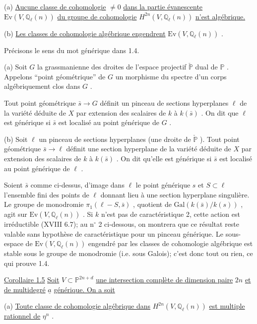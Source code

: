 (a) \underline{Aucune classe de cohomologie} $\neq 0$ \underline{dans la partie évanescente} $\mathrm{Ev}(V, \mathbb{Q}_\ell(n))$ \underline{du groupe de cohomologie} $H^{2n}(V, \mathbb{Q}_\ell(n))$ \underline{n'est algébrique.}

(b) \underline{Les classes de cohomologie algébrique engendrent} $\mathrm{Ev}(V, \mathbb{Q}_\ell(n))$ .

Précisons le sens du mot générique dans 1.4.

(a) Soit $G$ la grassmanienne des droites de l'espace projectif $\check{\mathbb{P}}$ dual de $\mathbb{P}$ . Appelons ``point géométrique'' de $G$ un morphisme du spectre d'un corps algébriquement clos dans $G$ .

Tout point géométrique $\bar{s} \to G$ définit un pinceau de sections hyperplanes $\ell$ de la variété déduite de $X$ par extension des scalaires de $k$ à $k(\bar{s})$ . On dit que $\ell$ est générique si $\bar{s}$ est localisé au point générique de $G$ .

(b) Soit $\ell$ un pinceau de sections hyperplanes (une droite de $\check{\mathbb{P}}$ ). Tout point géométrique $\bar{s} \to \ell$ définit une section hyperplane de la variété déduite de $X$ par extension des scalaires de $k$ à $k(\bar{s})$ . On dit qu'elle est générique si $\bar{s}$ est localisé au point générique de $\ell$ .

Soient $\bar{s}$ comme ci-dessus, d'image dans $\ell$ le point générique $s$ et $S \subset \ell$ l'ensemble fini des points de $\ell$ donnant lieu à une section hyperplane singulière. Le groupe de monodromie $\pi_1(\ell - S, \bar{s})$ , quotient de $\mathrm{Gal}(k(\bar{s})/k(s))$ , agit sur $\mathrm{Ev}(V, \mathbb{Q}_\ell(n))$ . Si $k$ n'est pas de caractéristique 2, cette action est irréductible (XVIII 6.7); au n$^{\circ}$ 2 ci-dessous, on montrera que ce résultat reste valable sans hypothèse de caractéristique pour un pinceau générique. Le sous-espace de $\mathrm{Ev}(V, \mathbb{Q}_\ell(n))$ engendré par les classes de cohomologie algébrique est stable sous le groupe de monodromie (i.e. sous Galois); c'est donc tout ou rien, ce qui prouve 1.4.



\underline{Corollaire 1.5} \quad \underline{Soit} $V \subset \mathbb{P}^{2n+d}$ \underline{une intersection complète de dimension paire} $2n$ \underline{et de multidegré} $\underline{a}$ \underline{générique. On a soit}

(a) \underline{Toute classe de cohomologie algébrique dans} $H^{2n}(V, \mathbb{Q}_\ell(n))$ \underline{est multiple rationnel de} $\eta^n$ .

